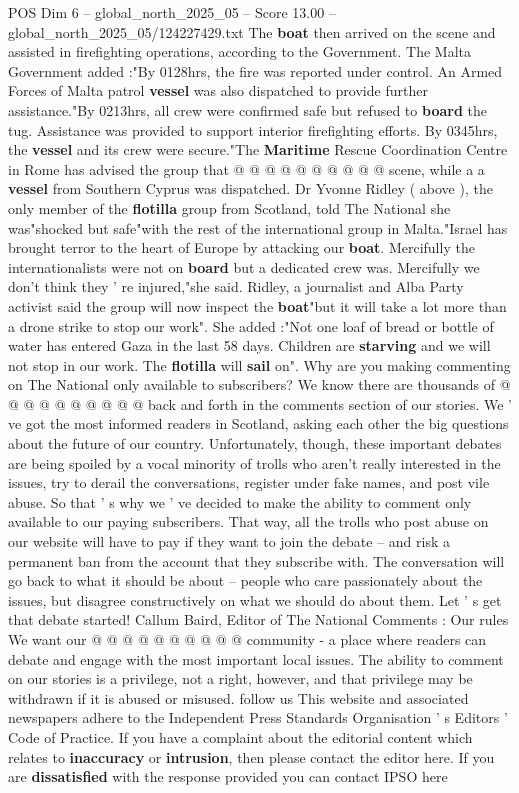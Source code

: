 \begin{textsample}{POS Dim 6 – global\_north\_2025\_05 – Score 13.00 – global\_north\_2025\_05/124227429.txt}
The \textbf{boat} then arrived on the scene and assisted in firefighting operations, according to the Government.
The Malta Government added :"By 0128hrs, the fire was reported under control.
An Armed Forces of Malta patrol \textbf{vessel} was also dispatched to provide further assistance."By 0213hrs, all crew were confirmed safe but refused to \textbf{board} the tug.
Assistance was provided to support interior firefighting efforts.
By 0345hrs, the \textbf{vessel} and its crew were secure."The \textbf{Maritime} Rescue Coordination Centre in Rome has advised the group that @ @ @ @ @ @ @ @ @ @ scene, while a a \textbf{vessel} from Southern Cyprus was dispatched.
Dr Yvonne Ridley ( above ), the only member of the \textbf{flotilla} group from Scotland, told The National she was"shocked but safe"with the rest of the international group in Malta."Israel has brought terror to the heart of Europe by attacking our \textbf{boat}.
Mercifully the internationalists were not on \textbf{board} but a dedicated crew was.
Mercifully we don't think they ' re injured,"she said.
Ridley, a journalist and Alba Party activist said the group will now inspect the \textbf{boat}"but it will take a lot more than a drone strike to stop our work".
She added :"Not one loaf of bread or bottle of water has entered Gaza in the last 58 days.
Children are \textbf{starving} and we will not stop in our work.
The \textbf{flotilla} will \textbf{sail} on".
Why are you making commenting on The National only available to subscribers?
We know there are thousands of @ @ @ @ @ @ @ @ @ @ back and forth in the comments section of our stories.
We ' ve got the most informed readers in Scotland, asking each other the big questions about the future of our country.
Unfortunately, though, these important debates are being spoiled by a vocal minority of trolls who aren't really interested in the issues, try to derail the conversations, register under fake names, and post vile abuse.
So that ' s why we ' ve decided to make the ability to comment only available to our paying subscribers.
That way, all the trolls who post abuse on our website will have to pay if they want to join the debate -- and risk a permanent ban from the account that they subscribe with.
The conversation will go back to what it should be about -- people who care passionately about the issues, but disagree constructively on what we should do about them.
Let ' s get that debate started!
Callum Baird, Editor of The National Comments : Our rules We want our @ @ @ @ @ @ @ @ @ @ community - a place where readers can debate and engage with the most important local issues.
The ability to comment on our stories is a privilege, not a right, however, and that privilege may be withdrawn if it is abused or misused. follow us This website and associated newspapers adhere to the Independent Press Standards Organisation ' s Editors ' Code of Practice.
If you have a complaint about the editorial content which relates to \textbf{inaccuracy} or \textbf{intrusion}, then please contact the editor here.
If you are \textbf{dissatisfied} with the response provided you can contact IPSO here


\end{textsample}
